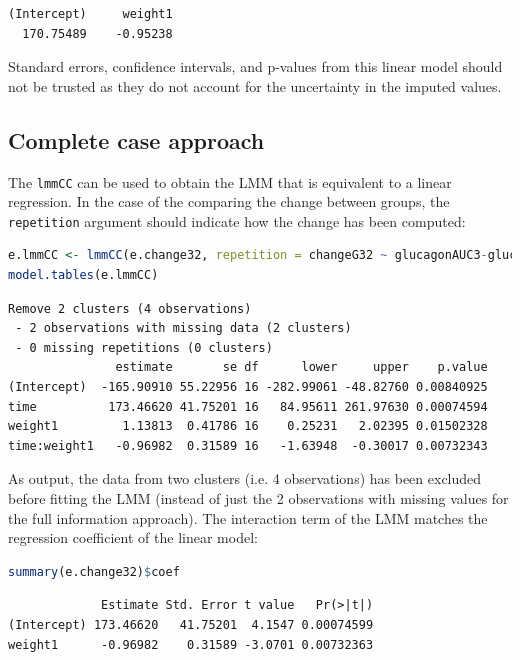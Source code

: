 \documentclass[12pt]{article}
\newcommand\Warning[1][3ex]{%
\renewcommand\stacktype{L}%
\scaleto{\stackon[1.3pt]{\color{red}$\triangle$}{\tiny\bfseries !}}{#1}%
\xspace
}
\begin{document}
\label{}
\begin{verbatim}
(Intercept)     weight1 
  170.75489    -0.95238
\end{verbatim}



\Warning Standard errors, confidence intervals, and p-values from this
linear model should not be trusted as they do not account for the
uncertainty in the imputed values.
\subsection{Complete case approach}
\label{sec:org094c0d9}

The \texttt{lmmCC} can be used to obtain the LMM that is equivalent to a
linear regression. In the case of the comparing the change between
groups, the \texttt{repetition} argument should indicate how the change has
been computed:
\begin{lstlisting}[language=r,numbers=none]
e.lmmCC <- lmmCC(e.change32, repetition = changeG32 ~ glucagonAUC3-glucagonAUC2|id)
model.tables(e.lmmCC)
\end{lstlisting}

\label{}
\begin{verbatim}
Remove 2 clusters (4 observations) 
 - 2 observations with missing data (2 clusters) 
 - 0 missing repetitions (0 clusters)
               estimate       se df      lower     upper    p.value
(Intercept)  -165.90910 55.22956 16 -282.99061 -48.82760 0.00840925
time          173.46620 41.75201 16   84.95611 261.97630 0.00074594
weight1         1.13813  0.41786 16    0.25231   2.02395 0.01502328
time:weight1   -0.96982  0.31589 16   -1.63948  -0.30017 0.00732343
\end{verbatim}


As output, the data from two clusters (i.e. 4 observations) has been
excluded before fitting the LMM (instead of just the 2 observations
with missing values for the full information approach). The
interaction term of the LMM matches the regression coefficient of the
linear model:
\begin{lstlisting}[language=r,numbers=none]
summary(e.change32)$coef
\end{lstlisting}

\label{}
\begin{verbatim}
             Estimate Std. Error t value   Pr(>|t|)
(Intercept) 173.46620   41.75201  4.1547 0.00074599
weight1      -0.96982    0.31589 -3.0701 0.00732363
\end{verbatim}
\end{document}
